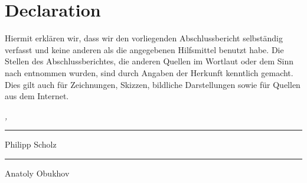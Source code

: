 %
\chapter*{Declaration}
\label{sec:declaration}
\thispagestyle{empty}

Hiermit erklären wir, dass wir den vorliegenden Abschlussbericht selbständig verfasst
und keine anderen als die angegebenen Hilfsmittel benutzt habe. Die Stellen des
Abschlussberichtes, die anderen Quellen im Wortlaut oder dem Sinn nach entnommen
wurden, sind durch Angaben der Herkunft kenntlich gemacht. Dies gilt auch für
Zeichnungen, Skizzen, bildliche Darstellungen sowie für Quellen aus dem Internet.

\bigskip

\noindent\textit{\thesisUniversityCity, \thesisDate}

\smallskip

\begin{flushright}
	\begin{minipage}{5cm}
		\rule{\textwidth}{1pt}
		\centering Philipp Scholz
	\end{minipage}
\end{flushright}

\bigskip

\begin{flushright}
	\begin{minipage}{5cm}
		\rule{\textwidth}{1pt}
		\centering Anatoly Obukhov
	\end{minipage}
\end{flushright}




